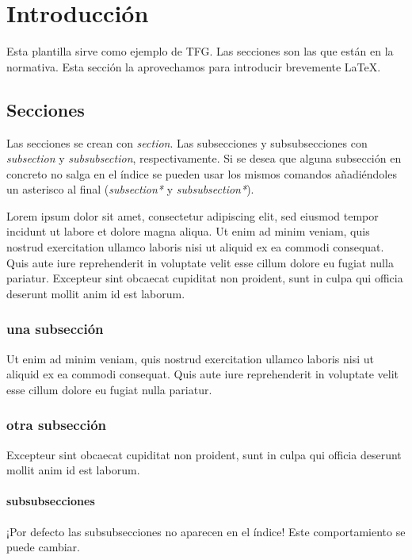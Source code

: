 
\chapter{Introducción}
Esta plantilla sirve como ejemplo de TFG.
Las secciones son las que están en la normativa.
Esta sección la aprovechamos para introducir brevemente \LaTeX.
\par

\section{Secciones}
Las secciones se crean con \textit{section}.
Las subsecciones y subsubsecciones con \textit{subsection} y \textit{subsubsection}, respectivamente.
Si se desea que alguna subsección en concreto no salga en el índice se pueden usar los mismos comandos añadiéndoles un asterisco al final (\textit{subsection*} y \textit{subsubsection*}).
\par
Lorem ipsum dolor sit amet, consectetur adipiscing elit, sed eiusmod tempor incidunt ut labore et dolore magna aliqua.
Ut enim ad minim veniam, quis nostrud exercitation ullamco laboris nisi ut aliquid ex ea commodi consequat.
Quis aute iure reprehenderit in voluptate velit esse cillum dolore eu fugiat nulla pariatur.
Excepteur sint obcaecat cupiditat non proident, sunt in culpa qui officia deserunt mollit anim id est laborum.
\subsection{una subsección}
Ut enim ad minim veniam, quis nostrud exercitation ullamco laboris nisi ut aliquid ex ea commodi consequat.
Quis aute iure reprehenderit in voluptate velit esse cillum dolore eu fugiat nulla pariatur.
\subsection{otra subsección}
Excepteur sint obcaecat cupiditat non proident, sunt in culpa qui officia deserunt mollit anim id est laborum.
\subsubsection{subsubsecciones}
¡Por defecto las subsubsecciones no aparecen en el índice! Este comportamiento se puede cambiar.


